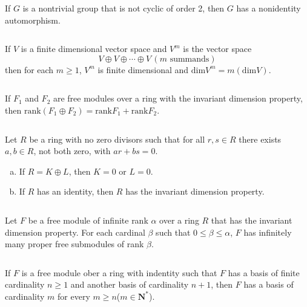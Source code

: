 $$ $$

\begin{ex}
    If $G$ is a nontrivial group that is not cyclic of order 2, then $G$ has a nonidentity automorphism.
\end{ex}

$$ $$

\begin{ex}
    If $V$ is a finite dimensional vector space and $V^{m}$ is the vector space\[V\oplus V\oplus\cdots\oplus V \,(m \text{ summands})\] then for each $m\geq 1$, $V^{m}$ is finite dimensional and $\mathrm{dim} V^{m}=m(\mathrm{dim}V)$.
\end{ex}

$$ $$

\begin{ex}
    If $F_{1}$ and $F_{2}$ are free modules over a ring with the invariant dimension property, then $\mathrm{rank}(F_{1}\oplus F_{2})=\mathrm{rank}F_{1}+\mathrm{rank}F_{2}$.
\end{ex}

$$ $$

\begin{ex}
    Let $R$ be a ring with no zero divisors such that for all $r,s\in R$ there exists $a,b\in R$, not both zero, with $ar+bs=0$.
    \begin{enumerate}[(a)]
        \item If $R=K\oplus L$, then $K=0$ or $L=0$.
        \item If $R$ has an identity, then $R$ has the invariant dimension property.
    \end{enumerate}
\end{ex}

$$ $$

\begin{ex}
    Let $F$ be a free module of infinite rank $\alpha$ over a ring $R$ that has the invariant dimension property. For each cardinal $\beta$ such that $0\leq \beta\leq \alpha$, $F$ has infinitely many proper free submodules of rank $\beta$.
\end{ex}

$$ $$

\begin{ex}
    If $F$ is a free module ober a ring with indentity such that $F$ has a basis of finite cardinality $n\geq 1$ and another basis of cardinality $n+1$, then $F$ has a basis of cardinality $m$ for every $m\geq n$($m\in \mathbf{N}^{*}$).
\end{ex}

$$ $$

